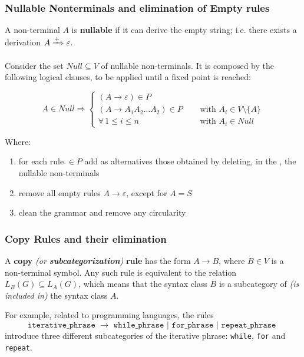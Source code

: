 \documentclass[english]{article}
\begin{document}
\subsubsection{Nullable Nonterminals and elimination of Empty rules}
\label{sec:nullable-non-terminals-and-elimination-of-empty-rules}

A non-terminal \(A\) is \textbf{nullable} if it can derive the empty string;
i.e. there exists a derivation \(A \xRightarrow{+} \varepsilon\).

Consider the set \(\textit{Null} \subseteq V\) of nullable non-terminals.
It is composed by the following logical clauses, to be applied until a fixed point is reached:

\[
  A \in \textit{Null} \Rightarrow
  \begin{cases}
    (A \rightarrow \varepsilon) \in P                                                        \\
    (A \rightarrow A_1 A_2 \ldots A_2) \in P \quad & \text{ with } A_i \in V \setminus \{A\} \\
    \forall \, 1 \leq i \leq n \quad               & \text{ with } A_i \in \textit{Null}
  \end{cases}
\]

Where:

\begin{enumerate}[label=row \arabic*), left=20pt]
  \item for each rule \(\in P\) add as alternatives those obtained by deleting, in the \RP, the nullable non-terminals
  \item remove all empty rules \(A \rightarrow \varepsilon\), except for \(A=S\)
  \item clean the grammar and remove any circularity
\end{enumerate}

\subsubsection{Copy Rules and their elimination}
\label{sec:copy-rules-and-their-elimination}

A \textbf{copy}\textit{ (or \textbf{subcategorization})} \textbf{rule} has the form \(A \rightarrow B\), where \(B \in V\) is a non-terminal symbol.
Any such rule is equivalent to the relation \(L_B(G) \subseteq L_A(G)\), which means that the syntax class \(B\) is a subcategory of \textit{(is included in)} the syntax class \(A\).

For example, related to programming languages, the rules
\[\texttt{iterative\_phrase } \rightarrow \texttt{ while\_phrase } | \texttt{ for\_phrase } | \texttt{ repeat\_phrase }\]
introduce three different subcategories of the iterative phrase: \texttt{while}, \texttt{for} and \texttt{repeat}.
\end{document}
